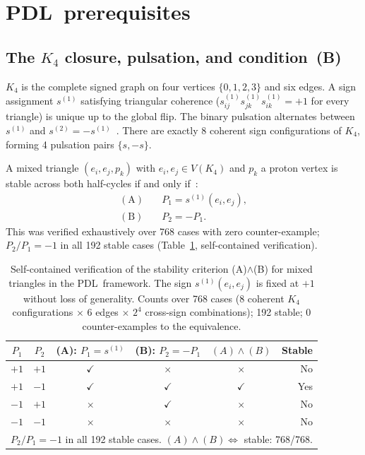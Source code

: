 \documentclass[11pt,a4paper]{article}
\theoremstyle{definition}
\newcommand{\PDL}{\textnormal{PDL}}
\newcommand{\Kfour}{K_4}
\begin{document}
\section{\PDL\ prerequisites}
\label{sec:prereq}

\subsection{The \texorpdfstring{$K_4$}{K4} closure, pulsation, and condition~(B)}

$\Kfour$ is the complete signed graph on four vertices $\{0,1,2,3\}$ and six edges. A sign assignment $s^{(1)}$ satisfying triangular coherence ($s^{(1)}_{ij}s^{(1)}_{jk}s^{(1)}_{ik} = +1$ for every triangle) is unique up to the global flip. The binary pulsation alternates between $s^{(1)}$ and $s^{(2)} = -s^{(1)}$~\cite{PDL_Main_2026}. There are exactly 8 coherent sign configurations of $\Kfour$, forming 4 pulsation pairs $\{s,-s\}$.

A mixed triangle $(e_i, e_j, p_k)$ with $e_i, e_j \in V(\Kfour)$ and $p_k$ a proton vertex is stable across both half-cycles if and only if~\cite{PDL_D29_2026}:
\begin{align}
\mathrm{(A)}&\quad P_1 = s^{(1)}(e_i,e_j), \label{eq:condA}\\
\mathrm{(B)}&\quad P_2 = -P_1. \label{eq:condB}
\end{align}
This was verified exhaustively over 768 cases with zero counter-example; $P_2/P_1 = -1$ in all 192 stable cases (Table~\ref{tab:condB}, self-contained verification).

\begin{table}[ht]
\centering
\caption{Self-contained verification of the stability criterion (A)$\wedge$(B) for mixed triangles in the \PDL\ framework. The sign $s^{(1)}(e_i,e_j)$ is fixed at $+1$ without loss of generality. Counts over 768 cases (8 coherent $K_4$ configurations $\times$ 6 edges $\times$ $2^4$ cross-sign combinations); 192 stable; 0 counter-examples to the equivalence.}

\bigskip

\label{tab:condB}
\begin{tabular}{cccccr}
\toprule
$P_1$ & $P_2$ & (A): $P_1 = s^{(1)}$ & (B): $P_2 = -P_1$ & $(A)\wedge(B)$ & Stable \\
\midrule
$+1$ & $+1$ & $\checkmark$ & $\times$ & $\times$ & No \\
$+1$ & $-1$ & $\checkmark$ & $\checkmark$ & $\checkmark$ & Yes \\
$-1$ & $+1$ & $\times$ & $\checkmark$ & $\times$ & No \\
$-1$ & $-1$ & $\times$ & $\times$ & $\times$ & No \\
\bottomrule
\multicolumn{6}{l}{\small $P_2/P_1 = -1$ in all 192 stable cases. $(A)\wedge(B) \Leftrightarrow$ stable: 768/768.}
\end{tabular}
\end{table}
\end{document}
